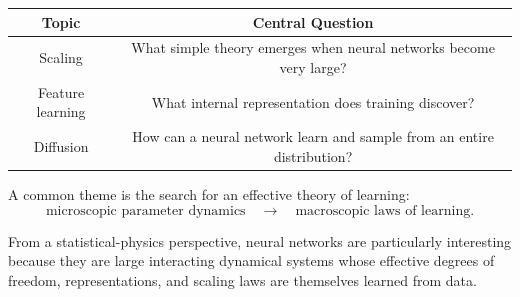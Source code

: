 \begin{center}
\begin{tabular}{c|c}
\textbf{Topic} & \textbf{Central Question}\\
\hline
Scaling
&
What simple theory emerges when neural networks become very large?
\\[4pt]
Feature learning
&
What internal representation does training discover?
\\[4pt]
Diffusion
&
How can a neural network learn and sample from an entire distribution?
\end{tabular}
\end{center}

A common theme is the search for an effective theory of learning:
\begin{equation}
    \boxed{
    \text{microscopic parameter dynamics}
    \quad\longrightarrow\quad
    \text{macroscopic laws of learning}.
    }
\end{equation}

From a statistical-physics perspective, neural networks are particularly
interesting because they are large interacting dynamical systems whose
effective degrees of freedom, representations, and scaling laws are themselves
learned from data.
